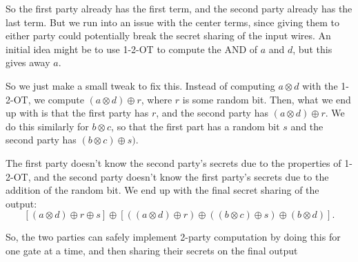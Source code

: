 \documentclass[11pt]{article}
\begin{document}
So the first party already has the first term, and the second party already has the last term.
But we run into an issue with the center terms, since giving them to either party could potentially break the secret sharing of the input wires.
An initial idea might be to use 1-2-OT to compute the AND of \(a\) and \(d\), but this gives away \(a\).

So we just make a small tweak to fix this.
Instead of computing \(a\otimes d\) with the 1-2-OT, we compute \((a\otimes d)\oplus r\), where \(r\) is some random bit.
Then, what we end up with is that the first party has \(r\), and the second party has \((a\otimes d)\oplus r\).
We do this similarly for \(b\otimes c\), so that the first part has a random bit \(s\) and the second party has \((b\otimes c)\oplus s)\).

The first party doesn't know the second party's secrets due to the properties of 1-2-OT,
and the second party doesn't know the first party's secrets due to the addition of the random bit.
We end up with the final secret sharing of the output:
\[\left[(a\otimes d)\oplus r\oplus s\right]\oplus \left[\left((a\otimes d)\oplus r\right)\oplus\left((b\otimes c)\oplus s\right)\oplus (b\otimes d)\right].\]

So, the two parties can safely implement 2-party computation by doing this for one gate at a time,
and then sharing their secrets on the final output
\end{document}
